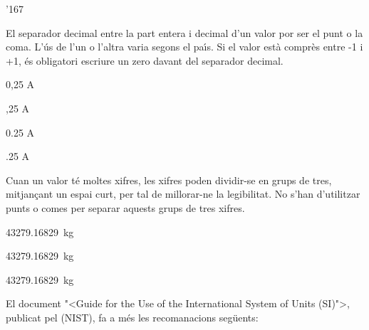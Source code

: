 \begin{dinglist}{'167}
\item El separador decimal entre la part entera i decimal d'un valor por ser el punt o la coma. L'\'{u}s de l'un o l'altra varia segons el pa\'{\i}s. Si el valor est\`{a} compr\`{e}s entre -1 i +1, \'{e}s obligatori escriure un zero davant del separador decimal.

\textcolor{Green}{} 0,25 A

\textcolor{Red}{}  ,25 A

\textcolor{Green}{} 0.25 A

\textcolor{Red}{}  .25 A


\item Cuan un valor t\'{e} moltes xifres, les xifres poden dividir-se en grups de tres, mitjan\c{c}ant un espai curt, per tal de millorar-ne la legibilitat. No s'han d'utilitzar punts o comes per separar aquests grups de tres xifres.

\textcolor{Green}{} \SI{43279,16829}{kg}

\textcolor{Green}{} \SI[group-separator =]{43279,16829}{kg}

\textcolor{Red}{}  \SI[group-separator = .]{43279,16829}{kg}

\end{dinglist}

El document  {"<}Guide for the Use of the International System of Units (SI){">}, publicat pel (\textsf{NIST}),  fa a m\'{e}s les recomanacions seg\"{u}ents:

